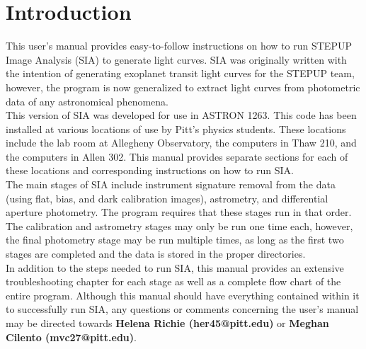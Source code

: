 \documentclass[11pt]{report}
\begin{document}
\tableofcontents
\chapter{Introduction}
\parindent0pt

This user's manual provides easy-to-follow instructions on how to run STEPUP Image Analysis (SIA) to generate light curves. SIA was originally written with the intention of generating exoplanet transit light curves for the STEPUP team, however, the program is now generalized to extract light curves from photometric data of any astronomical phenomena. \\

This version of SIA was developed for use in ASTRON 1263. This code has been installed at various locations of use by Pitt's physics students. These locations include the lab room at Allegheny Observatory, the computers in Thaw 210, and the computers in Allen 302. This manual provides separate sections for each of these locations and corresponding instructions on how to run SIA.\\

The main stages of SIA include instrument signature removal from the data (using flat, bias, and dark calibration images), astrometry, and differential aperture photometry. The program requires that these stages run in that order. The calibration and astrometry stages may only be run one time each, however, the final photometry stage may be run multiple times, as long as the first two stages are completed and the data is stored in the proper directories. \\

In addition to the steps needed to run SIA, this manual provides an extensive troubleshooting chapter for each stage as well as a complete flow chart of the entire program. Although this manual should have everything contained within it to successfully run SIA, any questions or comments concerning the user's manual may be directed towards \textbf{Helena Richie (her45@pitt.edu)} or \textbf{Meghan Cilento (mvc27@pitt.edu)}. 


\end{document}
